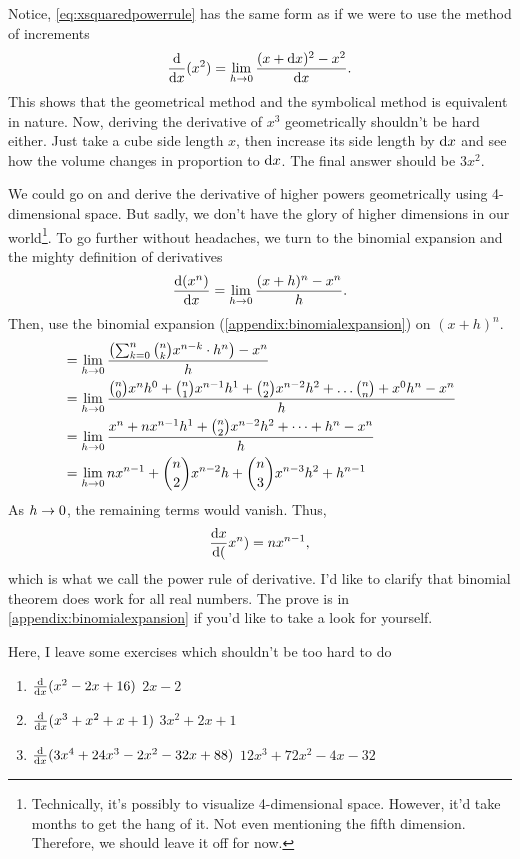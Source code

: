 Notice, \cref{eq:xsquaredpowerrule} has the same form as if we were to use the method of increments
\begin{equation*}
    \odv*{(x^2)}{x} = \lim_{h\appr 0}\frac{(x + \odif{x})^2 - x^2}{\odif{x}}.
\end{equation*}
This shows that the geometrical method and the symbolical method is equivalent in nature. Now, deriving the derivative of $x^3$ geometrically shouldn't be hard either. Just take a cube side length $x$, then increase its side length by $\odif{x}$ and see how the volume changes in proportion to $\odif{x}$. The final answer should be $3x^2$.

We could go on and derive the derivative of higher powers geometrically using 4-dimensional space. But sadly, we don't have the glory of higher dimensions in our world\footnote{Technically, it's possibly to visualize 4-dimensional space. However, it'd take months to get the hang of it. Not even mentioning the fifth dimension. Therefore, we should leave it off for now.}. To go further without headaches, we turn to the binomial expansion and the mighty definition of derivatives
\begin{equation*}
    \odv{(x^n)}{x} = \lim_{h \appr 0}\frac{(x + h)^n - x^n}{h}.
\end{equation*}
Then, use the binomial expansion (\cref{appendix:binomialexpansion}) on $(x + h)^n$.
\begin{align*}
    &= \lim_{h \rightarrow 0}\frac{\left(\sum_{k = 0}^n{n\choose k}x^{n - k}\cdot h^n\right) - x^n}{h} \\
    &= \lim_{h \rightarrow 0}{{n\choose 0}x^nh^0 + {n\choose 1}x^{n - 1}h^1 + {n\choose 2}x^{n - 2}h^2 +\dots {n\choose n} + x^0h^n - x^n\over h} \\
    &= \lim_{h \rightarrow 0}\frac{x^n + nx^{n - 1}h^1 + {n\choose 2}x^{n - 2}h^2 + \dots + h^n -x^n}{h} \\
    &= \lim_{h \rightarrow 0}nx^{n - 1} + {n\choose 2}x^{n - 2}h + {n\choose 3}x^{n - 3}h^2 + h^{n - 1}
\end{align*}
As $h\rightarrow 0$, the remaining terms would vanish. Thus,
\begin{equation}
    \odv{x}(x^n) = nx^{n - 1}, \label{eq:derivativepowerrule}
\end{equation}
which is what we call the power rule of derivative. I'd like to clarify that binomial theorem does work for all real numbers. The prove is in \cref{appendix:binomialexpansion} if you'd like to take a look for yourself.

Here, I leave some exercises which shouldn't be too hard to do
\begin{enumerate}
    \item $\odv*{(x^2 - 2x + 16)}{x}$ \hfill $2x - 2$
    \item $\odv*{(x^3 + x^2 + x + 1)}{x}$ \hfill $3x^2 + 2x + 1$
    \item $\odv*{(3x^4 + 24x^3 - 2x^2 - 32x + 88)}{x}$ \hfill $12x^3 + 72x^2 - 4x - 32$
\end{enumerate}

